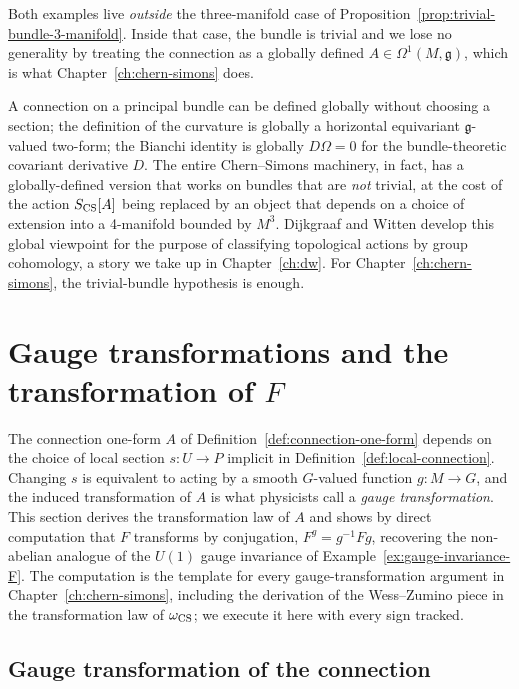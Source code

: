 \noindent Both examples live \emph{outside} the three-manifold case of Proposition~\ref{prop:trivial-bundle-3-manifold}. Inside that case, the bundle is trivial and we lose no generality by treating the connection as a globally defined $A \in \Omega^1(M, \mathfrak{g})$, which is what Chapter~\ref{ch:chern-simons} does.

\begin{remark}\label{rem:nakahara-pointer}
A connection on a principal bundle can be defined globally without choosing a section; the definition of the curvature is globally a horizontal equivariant $\mathfrak{g}$-valued two-form; the Bianchi identity is globally $D\Omega = 0$ for the bundle-theoretic covariant derivative $D$. The entire Chern--Simons machinery, in fact, has a globally-defined version that works on bundles that are \emph{not} trivial, at the cost of the action $S_{\operatorname{CS}}[A]$ being replaced by an object that depends on a choice of extension into a 4-manifold bounded by $M^3$. Dijkgraaf and Witten \cite{DijkgraafWitten1990} develop this global viewpoint for the purpose of classifying topological actions by group cohomology, a story we take up in Chapter~\ref{ch:dw}. For Chapter~\ref{ch:chern-simons}, the trivial-bundle hypothesis is enough.
\end{remark}


\section{Gauge transformations and the transformation of $F$}\label{sec:gauge-transf}

The connection one-form $A$ of Definition~\ref{def:connection-one-form} depends on the choice of local section $s : U \to P$ implicit in Definition~\ref{def:local-connection}. Changing $s$ is equivalent to acting by a smooth $G$-valued function $g : M \to G$, and the induced transformation of $A$ is what physicists call a \emph{gauge transformation}. This section derives the transformation law of $A$ and shows by direct computation that $F$ transforms by conjugation, $F^g = g^{-1} F g$, recovering the non-abelian analogue of the $U(1)$ gauge invariance of Example~\ref{ex:gauge-invariance-F}. The computation is the template for every gauge-transformation argument in Chapter~\ref{ch:chern-simons}, including the derivation of the Wess--Zumino piece in the transformation law of $\omega_{\operatorname{CS}}$; we execute it here with every sign tracked.

\subsection{Gauge transformation of the connection}

